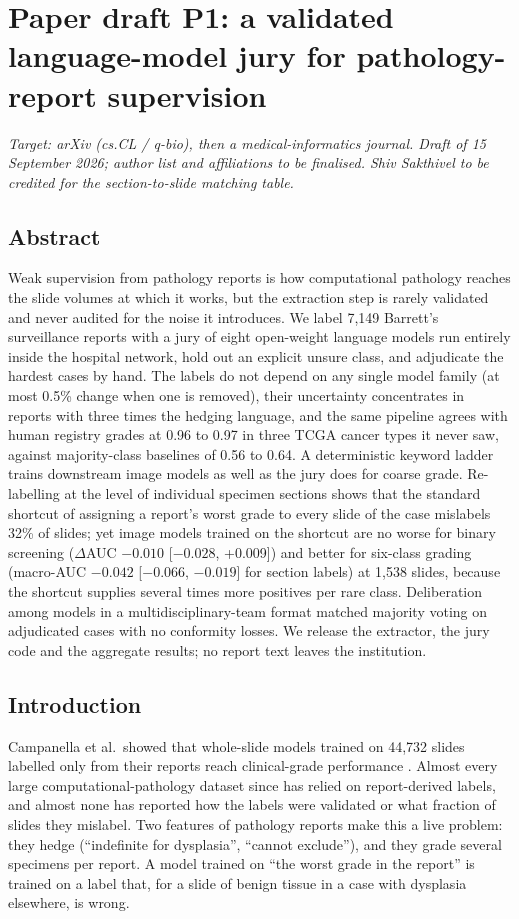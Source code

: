 \chapter{Paper draft P1: a validated language-model jury for pathology-report supervision}
\label{app:p1}

\noindent\emph{Target: arXiv (cs.CL / q-bio), then a medical-informatics journal. Draft of 15 September 2026; author list and affiliations to be finalised. Shiv Sakthivel to be credited for the section-to-slide matching table.}

\section*{Abstract}
Weak supervision from pathology reports is how computational pathology reaches the slide volumes at which it works, but the extraction step is rarely validated and never audited for the noise it introduces. We label 7,149 Barrett's surveillance reports with a jury of eight open-weight language models run entirely inside the hospital network, hold out an explicit unsure class, and adjudicate the hardest cases by hand. The labels do not depend on any single model family (at most 0.5\% change when one is removed), their uncertainty concentrates in reports with three times the hedging language, and the same pipeline agrees with human registry grades at 0.96 to 0.97 in three TCGA cancer types it never saw, against majority-class baselines of 0.56 to 0.64. A deterministic keyword ladder trains downstream image models as well as the jury does for coarse grade. Re-labelling at the level of individual specimen sections shows that the standard shortcut of assigning a report's worst grade to every slide of the case mislabels 32\% of slides; yet image models trained on the shortcut are no worse for binary screening ($\Delta$AUC $-0.010$ [$-0.028$, +0.009]) and better for six-class grading (macro-AUC $-0.042$ [$-0.066$, $-0.019$] for section labels) at 1,538 slides, because the shortcut supplies several times more positives per rare class. Deliberation among models in a multidisciplinary-team format matched majority voting on adjudicated cases with no conformity losses. We release the extractor, the jury code and the aggregate results; no report text leaves the institution.

\section{Introduction}
Campanella et al.\ showed that whole-slide models trained on 44,732 slides labelled only from their reports reach clinical-grade performance \citep{campanella2019}. Almost every large computational-pathology dataset since has relied on report-derived labels, and almost none has reported how the labels were validated or what fraction of slides they mislabel. Two features of pathology reports make this a live problem: they hedge (``indefinite for dysplasia'', ``cannot exclude''), and they grade several specimens per report. A model trained on ``the worst grade in the report'' is trained on a label that, for a slide of benign tissue in a case with dysplasia elsewhere, is wrong.

